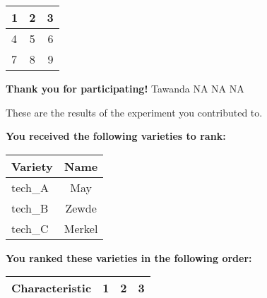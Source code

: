 \documentclass[10pt]{article}
\begin{document}
\begin{titlepage}
\begin{flushleft}
\begin{center}
  \begin{tabular}{ l | c | r }
    \hline
    1 & 2 & 3 \\ \hline
    4 & 5 & 6 \\ \hline
    7 & 8 & 9 \\
    \hline
  \end{tabular}
\end{center}



	\end{flushleft}
	\pagebreak



	\textbf{Thank you for participating!}
	\newline
	\newline
	Tawanda \newline
	NA \newline
	NA \newline
	NA \newline


	These are the results of the experiment you contributed to.

	\begin{flushleft}
		\textbf{You received the following varieties to rank: }\hfill \break
		\begin{tabularx}{\textwidth}{ X | c  }
			\hline
			\textbf{Variety} & \textbf{Name} \\ \hline

			
				tech\_A & May \\ \hline
			
				tech\_B & Zewde \\ \hline
			
				tech\_C & Merkel \\ \hline
			


		\end{tabularx}\newline \newline

		\textbf{You ranked these varieties in the following order: }\hfill \break
		\begin{tabularx}{\textwidth}{ X | c | c | c  }
			\hline
			\textbf{Characteristic}
			
				& \textbf{ 1 }
			
				& \textbf{ 2 }
			
				& \textbf{ 3 }
			
			\\ \hline


\end{tabularx}
\end{flushleft}
\end{titlepage}
\end{document}
